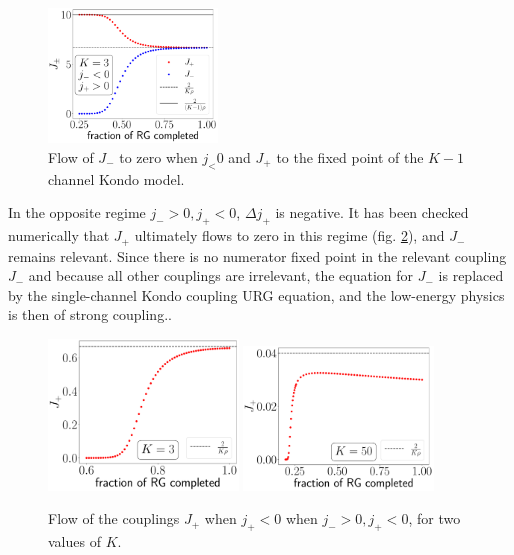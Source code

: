 \documentclass[12pt]{revtex4-2}
\begin{document}
\begin{figure}[htpb]
	\centering
	\includegraphics[width=0.4\textwidth]{../numerics/K to K-1.pdf}
	\caption{Flow of \(J_-\) to zero when \(j_< 0\) and \(J_+\) to the fixed point of the \(K-1\) channel Kondo model.}
	\label{K_to_K-1}
\end{figure}

In the opposite regime \(j_- > 0, j_+ < 0\), \(\Delta j_+\) is negative. It has been checked numerically that \(J_+\) ultimately flows to zero in this regime (fig. \ref{irrel_Jplus}), and \(J_-\) remains relevant. Since there is no numerator fixed point in the relevant coupling \(J_-\) and because all other couplings are irrelevant, the equation for \(J_-\) is replaced by the single-channel Kondo coupling URG equation, and the low-energy physics is then of strong coupling..
\begin{figure}[htpb]
	\centering
	\includegraphics[width=0.45\textwidth]{../numerics/irr_Jp_K=3.pdf}
	\includegraphics[width=0.45\textwidth]{../numerics/irr_Jp_K=50.pdf}
	\caption{Flow of the couplings \(J_+\) when \(j_+ < 0\) when \(j_- > 0, j_+ < 0\), for two values of \(K\).}
	\label{irrel_Jplus}
\end{figure}
\end{document}
